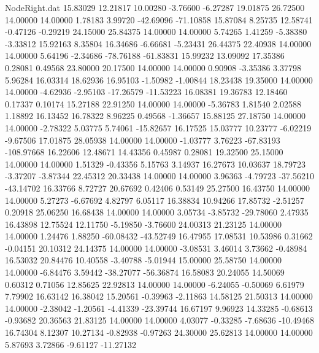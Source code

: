 \begin{filecontents}{NodeRight.dat}
  15.83029   12.21817   10.00280    -3.76600   -6.27287   19.01875   26.72500   14.00000   14.00000    1.78183    3.99720  -42.69096  -71.10858
  15.87084    8.25735   12.58741    -0.47126   -0.29219   24.15000   25.84375   14.00000   14.00000    5.74265    1.41259   -5.38380   -3.33812
  15.92163    8.35804   16.34686    -6.66681   -5.23431   26.44375   22.40938   14.00000   14.00000    5.64196   -2.34686  -78.76188  -61.83831
  15.99232   13.09092   17.35386     0.28081    0.49568   23.80000   20.17500   14.00000   14.00000    0.90908   -3.35386    3.37798    5.96284
  16.03314   18.62936   16.95103    -1.50982   -1.00844   18.23438   19.35000   14.00000   14.00000   -4.62936   -2.95103  -17.26579  -11.53223
  16.08381   19.36783   12.18460     0.17337    0.10174   15.27188   22.91250   14.00000   14.00000   -5.36783    1.81540    2.02588    1.18892
  16.13452   16.78322    8.96225     0.49568   -1.36657   15.88125   27.18750   14.00000   14.00000   -2.78322    5.03775    5.74061  -15.82657
  16.17525   15.03777   10.23777    -6.02219   -9.67506   17.01875   28.05938   14.00000   14.00000   -1.03777    3.76223  -67.83193 -108.97668
  16.22606   12.48671   14.43356     0.45987    0.28081   19.32500   25.15000   14.00000   14.00000    1.51329   -0.43356    5.15763    3.14937
  16.27673   10.03637   18.79723    -3.37207   -3.87344   22.45312   20.33438   14.00000   14.00000    3.96363   -4.79723  -37.56210  -43.14702
  16.33766    8.72727   20.67692     0.42406    0.53149   25.27500   16.43750   14.00000   14.00000    5.27273   -6.67692    4.82797    6.05117
  16.38834   10.94266   17.85732    -2.51257    0.20918   25.06250   16.68438   14.00000   14.00000    3.05734   -3.85732  -29.78060    2.47935
  16.43898   12.75524   12.11750    -5.19850   -3.76600   24.00313   21.23125   14.00000   14.00000    1.24476    1.88250  -60.08432  -43.52749
  16.47955   17.08531   10.53986     0.31662   -0.04151   20.10312   24.14375   14.00000   14.00000   -3.08531    3.46014    3.73662   -0.48984
  16.53032   20.84476   10.40558    -3.40788   -5.01944   15.00000   25.58750   14.00000   14.00000   -6.84476    3.59442  -38.27077  -56.36874
  16.58083   20.24055   14.50069     0.60312    0.71056   12.85625   22.92813   14.00000   14.00000   -6.24055   -0.50069    6.61979    7.79902
  16.63142   16.38042   15.20561    -0.39963   -2.11863   14.58125   21.50313   14.00000   14.00000   -2.38042   -1.20561   -4.41339  -23.39744
  16.67197    9.96923   14.33285    -0.68613   -0.93682   20.36563   21.83125   14.00000   14.00000    4.03077   -0.33285   -7.68636  -10.49468
  16.74304    8.12307   10.27134    -0.82938   -0.97263   24.30000   25.62813   14.00000   14.00000    5.87693    3.72866   -9.61127  -11.27132

\end{filecontents}
